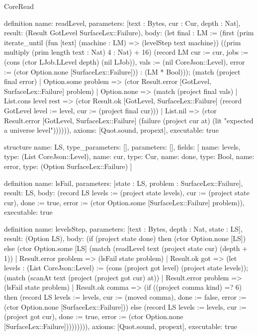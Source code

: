 \begin{lexlean}{CoreRead}
\begin{semanticmodule}
definition{
  name: readLevel,
  parameters: [text : Bytes, cur : Cur, depth : Nat],
  result: (Result GotLevel SurfaceLex::Failure),
  body: (let final : LM := (first (prim iterate_until (fun [text] (machine : LM) => (levelStep text machine)) ((prim multiply (prim length text : Nat) 4 : Nat) + 16) (record LM {cur := cur, jobs := (cons (ctor LJob.LLevel depth) (nil LJob)), vals := (nil CoreJson::Level), error := (ctor Option.none [SurfaceLex::Failure])}) : (LM * Bool))); (match (project final error)
    | Option.some problem => (ctor Result.error [GotLevel, SurfaceLex::Failure] problem)
    | Option.none => (match (project final vals)
      | List.cons level rest => (ctor Result.ok [GotLevel, SurfaceLex::Failure] (record GotLevel {level := level, cur := (project final cur)}))
      | List.nil => (ctor Result.error [GotLevel, SurfaceLex::Failure] (failure (project cur at) (lit "expected a universe level")))))),
  axioms: [Quot.sound, propext],
  executable: true
}

structure{
  name: LS,
  type_parameters: [],
  parameters: [],
  fields: [
    {name: levels, type: (List CoreJson::Level)},
    {name: cur, type: Cur},
    {name: done, type: Bool},
    {name: error, type: (Option SurfaceLex::Failure)}
  ]
}

definition{
  name: lsFail,
  parameters: [state : LS, problem : SurfaceLex::Failure],
  result: LS,
  body: (record LS {levels := (project state levels), cur := (project state cur), done := true, error := (ctor Option.some [SurfaceLex::Failure] problem)}),
  executable: true
}

definition{
  name: levelsStep,
  parameters: [text : Bytes, depth : Nat, state : LS],
  result: (Option LS),
  body: (if (project state done) then (ctor Option.none [LS]) else (ctor Option.some [LS] (match (readLevel text (project state cur) (depth + 1))
    | Result.error problem => (lsFail state problem)
    | Result.ok got => (let levels : (List CoreJson::Level) := (cons (project got level) (project state levels)); (match (scanAt text (project (project got cur) at))
      | Result.error problem => (lsFail state problem)
      | Result.ok comma => (if ((project comma kind) =? 6) then (record LS {levels := levels, cur := (moved comma), done := false, error := (ctor Option.none [SurfaceLex::Failure])}) else (record LS {levels := levels, cur := (project got cur), done := true, error := (ctor Option.none [SurfaceLex::Failure])}))))))),
  axioms: [Quot.sound, propext],
  executable: true
}


\end{semanticmodule}
\end{lexlean}
